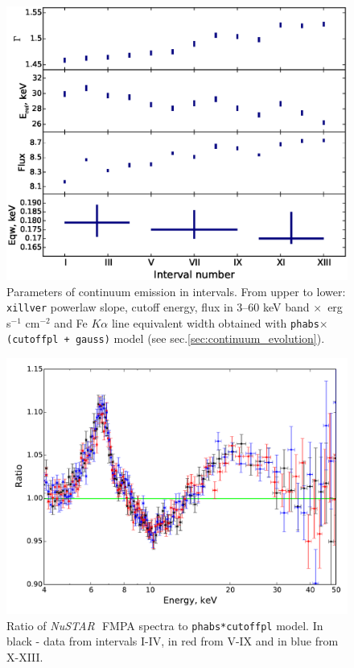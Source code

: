 \documentclass[a4paper,fleqn,usenatbib]{mnras}
\def\nustar{{\em NuSTAR\,}}
\begin{document}
\begin{figure}
\centerline{\includegraphics[width=\linewidth]{intspe_v04.eps}}
\caption{Parameters of continuum emission in intervals. From upper to lower: \texttt{xillver} powerlaw slope, cutoff energy,  flux in 3--60 keV band $\times$\, erg s$^{-1}$ cm$^{-2}$ and Fe $K\alpha$ line equivalent width obtained with \texttt{phabs$\times$(cutoffpl + gauss)} model (see sec.\ref{sec:continuum_evolution}).} 
\label{fig:intspe}
\end{figure}  

\begin{figure}
\centerline{\includegraphics[width=\linewidth]{ratios_v01.pdf}}
\caption{Ratio of \nustar\, FMPA spectra to \texttt{phabs*cutoffpl} model. In black - data from intervals I-IV, in red from V-IX and in blue from X-XIII.} 
\label{fig:ratios}
\end{figure}  
\end{document}

